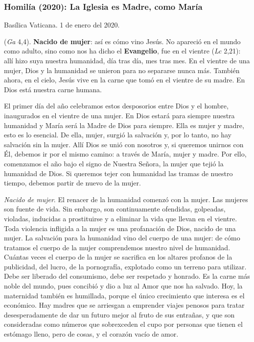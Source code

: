\subsubsection{Homilía (2020): La Iglesia es Madre, como María}

Basílica Vaticana. 1 de enero del 2020.

 (\emph{Ga} 4,4). \textbf{Nacido de mujer}: así es cómo vino Jesús. No apareció en el mundo como adulto, sino como nos ha dicho el \textbf{Evangelio}, fue  en el vientre (\emph{Lc} 2,21): allí hizo suya nuestra humanidad, día tras día, mes tras mes. En el vientre de una mujer, Dios y la humanidad se unieron para no separarse nunca más. También ahora, en el cielo, Jesús vive en la carne que tomó en el vientre de su madre. En Dios está nuestra carne humana.

El primer día del año celebramos estos desposorios entre Dios y el hombre, inaugurados en el vientre de una mujer. En Dios estará para siempre nuestra humanidad y María será la Madre de Dios para siempre. Ella es mujer y madre, esto es lo esencial. De ella, mujer, surgió la salvación y, por lo tanto, no hay salvación sin la mujer. Allí Dios se unió con nosotros y, si queremos unirnos con Él, debemos ir por el mismo camino: a través de María, mujer y madre. Por ello, comenzamos el año bajo el signo de Nuestra Señora, la mujer que tejió la humanidad de Dios. Si queremos tejer con humanidad las tramas de nuestro tiempo, debemos partir de nuevo de la mujer.

\emph{Nacido de mujer}. El renacer de la humanidad comenzó con la mujer. Las mujeres son fuente de vida. Sin embargo, son continuamente ofendidas, golpeadas, violadas, inducidas a prostituirse y a eliminar la vida que llevan en el vientre. Toda violencia infligida a la mujer es una profanación de Dios, nacido de una mujer. La salvación para la humanidad vino del cuerpo de una mujer: de cómo tratamos el cuerpo de la mujer comprendemos nuestro nivel de humanidad. Cuántas veces el cuerpo de la mujer se sacrifica en los altares profanos de la publicidad, del lucro, de la pornografía, explotado como un terreno para utilizar. Debe ser liberado del consumismo, debe ser respetado y honrado. Es la carne más noble del mundo, pues concibió y dio a luz al Amor que nos ha salvado. Hoy, la maternidad también es humillada, porque el único crecimiento que interesa es el económico. Hay madres que se arriesgan a emprender viajes penosos para tratar desesperadamente de dar un futuro mejor al fruto de sus entrañas, y que son consideradas como números que sobrexceden el cupo por personas que tienen el estómago lleno, pero de cosas, y el corazón vacío de amor.

